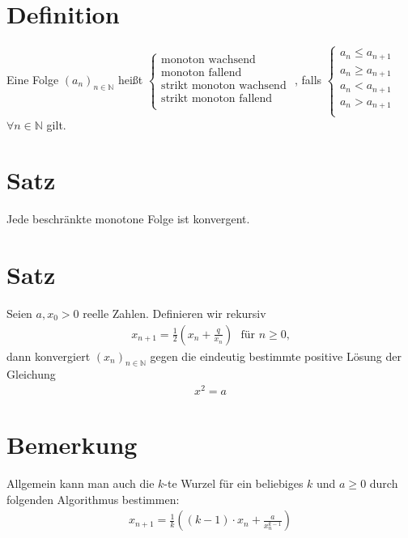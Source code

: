 \documentclass{scrreprt}
\newcommand{\NN}{\mathbb{N}}
\begin{document}
    \section{Definition}
    Eine Folge $(a_n)_{n \in \NN}$ heißt 
    $\begin{cases}
	    \text{monoton wachsend}\\
	    \text{monoton fallend}\\
	    \text{strikt monoton wachsend}\\
	    \text{strikt monoton fallend}\\
    \end{cases}$
    , falls $\begin{cases}
    a_n \leq a_{n+1}\\
    a_n \geq a_{n+1}\\
    a_n <a_{n+1}\\
    a_n > a_{n+1}\\
    \end{cases}$
     $\forall n \in \NN$ gilt.

   	\section{Satz}
   	Jede beschränkte monotone Folge ist konvergent.

   	\section{Satz}
   	Seien $a, x_0 >0$ reelle Zahlen. Definieren wir rekursiv
   	\begin{align*}
   		x_{n+1} = \frac{1}{2}\left(x_n + \frac{q}{x_n}\right)~~~ \text{für $n \geq 0$,}
   	\end{align*}
   	dann konvergiert $(x_n)_{n \in \NN}$ gegen die eindeutig bestimmte positive Lösung der Gleichung
   	\begin{align*}
   		x^2 = a
   	\end{align*}

   	\section{Bemerkung}
   	Allgemein kann man auch die $k$-te Wurzel für ein beliebiges $k$ und $a \geq 0$ durch folgenden Algorithmus bestimmen:
   	\begin{align*}
   		x_{n+1} = \frac{1}{k} \left( (k - 1) \cdot x_n + \frac{a}{x_n^{k-1}}\right)
   	\end{align*}
\end{document}
